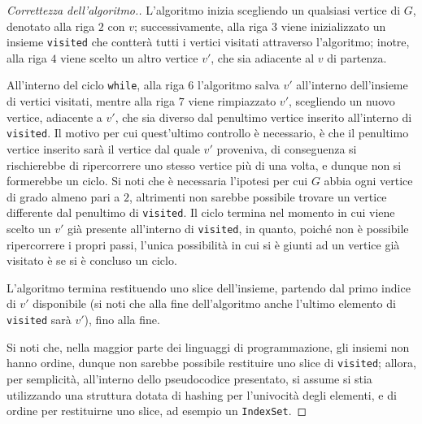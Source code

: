 \documentclass[a4paper, 12pt]{report}
\begin{document}
    \begin{proof}[Correttezza dell'algoritmo.]
        L'algoritmo inizia scegliendo un qualsiasi vertice di $G$, denotato alla riga $2$ con $v$; successivamente, alla riga $3$ viene inizializzato un insieme \texttt{visited} che contterà tutti i vertici visitati attraverso l'algoritmo; inotre, alla riga $4$ viene scelto un altro vertice $v'$, che sia adiacente al $v$ di partenza.

        All'interno del ciclo \texttt{while}, alla riga $6$ l'algoritmo salva $v'$ all'interno dell'insieme di vertici visitati, mentre alla riga $7$ viene rimpiazzato $v'$, scegliendo un nuovo vertice, adiacente a $v'$, che sia diverso dal penultimo vertice inserito all'interno di \texttt{visited}. Il motivo per cui quest'ultimo controllo è necessario, è che il penultimo vertice inserito sarà il vertice dal quale $v'$ proveniva, di conseguenza si rischierebbe di ripercorrere uno stesso vertice più di una volta, e dunque non si formerebbe un ciclo. Si noti che è necessaria l'ipotesi per cui $G$ abbia ogni vertice di grado almeno pari a $2$, altrimenti non sarebbe possibile trovare un vertice differente dal penultimo di \texttt{visited}. Il ciclo termina nel momento in cui viene scelto un $v'$ già presente all'interno di \texttt{visited}, in quanto, poiché non è possibile ripercorrere i propri passi, l'unica possibilità in cui si è giunti ad un vertice già visitato è se si è concluso un ciclo.
        
        L'algoritmo termina restituendo uno slice dell'insieme, partendo dal primo indice di $v'$ disponibile (si noti che alla fine dell'algoritmo anche l'ultimo elemento di \texttt{visited} sarà $v'$), fino alla fine.

        Si noti che, nella maggior parte dei linguaggi di programmazione, gli insiemi non hanno ordine, dunque non sarebbe possibile restituire uno slice di \texttt{visited}; allora, per semplicità, all'interno dello pseudocodice presentato, si assume si stia utilizzando una struttura dotata di hashing per l'univocità degli elementi, e di ordine per restituirne uno slice, ad esempio un \texttt{IndexSet}.
    \end{proof}
\end{document}
